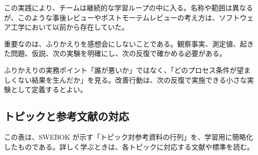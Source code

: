 \documentclass[a4paper,11pt]{ltjsarticle}
\numberwithin{figure}{section}
\numberwithin{table}{section}
\begin{document}
この実践により、チームは継続的な学習ループの中に入る。名称や範囲は異なるが、このような事後レビューやポストモーテムレビューの考え方は、ソフトウェア工学において以前から存在していた。

重要なのは、ふりかえりを感想会にしないことである。観察事実、測定値、起きた問題、仮説、次の実験を明確にし、次の反復で確かめる必要がある。

\begin{pointbox}{ふりかえりの実務ポイント}「誰が悪いか」ではなく、「どのプロセス条件が望ましくない結果を生んだか」を見る。改善行動は、次の反復で実施できる小さな実験として定義するとよい。\end{pointbox}
\subsection{トピックと参考文献の対応}
この表は、SWEBOK が示す「トピック対参考資料の行列」を、学習用に簡略化したものである。詳しく学ぶときは、各トピックに対応する文献や標準を読む。
\end{document}
